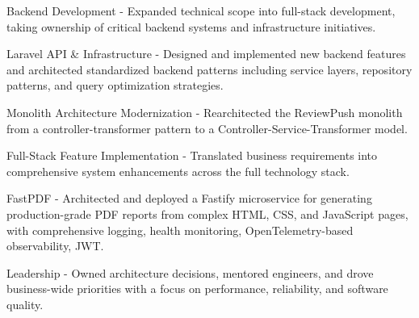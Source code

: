 \begin{cventries}
{\begin{cvsubitems}
        \end{cvsubitems}
        \begin{cvitems} %
            \item {Backend Development - Expanded technical scope into full-stack development, taking ownership of critical backend systems and infrastructure initiatives.}
        \end{cvitems}
        \begin{cvsubitems}
            \item {Laravel API \& Infrastructure - Designed and implemented new backend features and architected standardized backend patterns including service layers, repository patterns, and query optimization strategies.}
            \item {Monolith Architecture Modernization - Rearchitected the ReviewPush monolith from a controller-transformer pattern to a Controller-Service-Transformer model.}
            \item {Full-Stack Feature Implementation - Translated business requirements into comprehensive system enhancements across the full technology stack.}
            \item {FastPDF - Architected and deployed a Fastify microservice for generating production-grade PDF reports from complex HTML, CSS, and JavaScript pages, with comprehensive logging, health monitoring, OpenTelemetry-based observability, JWT.}
        \end{cvsubitems}
        \begin{cvitems}
            \item {Leadership - Owned architecture decisions, mentored engineers, and drove business-wide priorities with a focus on performance, reliability, and software quality.}
        \end{cvitems}
    }
\end{cventries}
